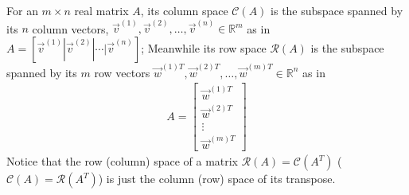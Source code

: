\begin{defn}
\label{defn:colrowspace}
For an $m \times n$ real matrix $A$, its column space $\mathcal{C}(A)$ is the subspace spanned by its $n$ column vectors, $\vec{v}^{(1)}, \vec{v}^{(2)}, \ldots, \vec{v}^{(n)} \in \mathbb{R}^m$ as in $A = [\vec{v}^{(1)}|\vec{v}^{(2)}|\cdots|\vec{v}^{(n)}]$; Meanwhile its row space $\mathcal{R}(A)$ is the subspace spanned by its $m$ row vectors $\vec{w}^{(1)T}, \vec{w}^{(2)T}, \ldots, \vec{w}^{(m)T} \in \mathbb{R}^n$ as in
\begin{align*}
A = 
\left[\begin{array}{c}
\vec{w}^{(1)T} \\
\hline
\vec{w}^{(2)T} \\
\hline
\vdots \\
\hline
\vec{w}^{(m)T}
\end{array}\right]
\end{align*}
Notice that the row (column) space of a matrix $\mathcal{R}(A) = \mathcal{C}(A^T)$ ($\mathcal{C}(A) = \mathcal{R}(A^T)$) is just the column (row) space of its transpose. 
\end{defn}

